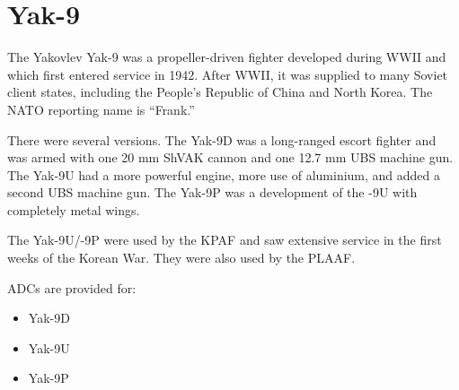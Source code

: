\section*{Yak-9}

The Yakovlev Yak-9 was a propeller-driven fighter developed during WWII and which first entered service in 1942. After WWII, it was supplied to many Soviet client states, including the People's Republic of China and North Korea. The NATO reporting name is “Frank.”

There were several versions. The Yak-9D was a long-ranged escort fighter and was armed with one 20 mm ShVAK cannon and one 12.7 mm UBS machine gun. The Yak-9U had a more powerful engine, more use of aluminium, and added a second UBS machine gun. The Yak-9P was a development of the -9U with completely metal wings.

The Yak-9U/-9P were used by the KPAF and saw extensive service in the first weeks of the Korean War. They were also used by the PLAAF.

ADCs are provided for:
\begin{itemize}
\item Yak-9D
\item Yak-9U
\item Yak-9P
\end{itemize}
